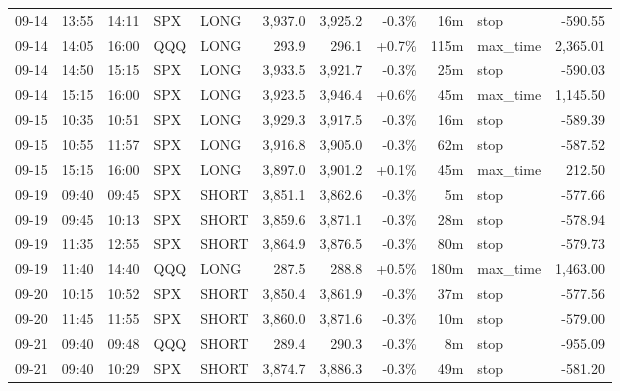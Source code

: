 \documentclass[11pt,a4paper,twoside]{article}
\begin{document}
\begin{center}
\begin{longtable}{>{\color{txtmain}}l l l l l r r r r >{\color{txtmain}}l r}
09-14 & 13:55 & 14:11 & SPX & LONG & 3,937.0 & 3,925.2 & \textcolor{lossred}{-0.3\%} & 16m & stop & \textcolor{lossred}{-590.55} \\
09-14 & 14:05 & 16:00 & QQQ & LONG & 293.9 & 296.1 & \textcolor{wingreen}{+0.7\%} & 115m & max\_time & \textcolor{wingreen}{2,365.01} \\
09-14 & 14:50 & 15:15 & SPX & LONG & 3,933.5 & 3,921.7 & \textcolor{lossred}{-0.3\%} & 25m & stop & \textcolor{lossred}{-590.03} \\
09-14 & 15:15 & 16:00 & SPX & LONG & 3,923.5 & 3,946.4 & \textcolor{wingreen}{+0.6\%} & 45m & max\_time & \textcolor{wingreen}{1,145.50} \\
09-15 & 10:35 & 10:51 & SPX & LONG & 3,929.3 & 3,917.5 & \textcolor{lossred}{-0.3\%} & 16m & stop & \textcolor{lossred}{-589.39} \\
09-15 & 10:55 & 11:57 & SPX & LONG & 3,916.8 & 3,905.0 & \textcolor{lossred}{-0.3\%} & 62m & stop & \textcolor{lossred}{-587.52} \\
09-15 & 15:15 & 16:00 & SPX & LONG & 3,897.0 & 3,901.2 & \textcolor{wingreen}{+0.1\%} & 45m & max\_time & \textcolor{wingreen}{212.50} \\
09-19 & 09:40 & 09:45 & SPX & SHORT & 3,851.1 & 3,862.6 & \textcolor{lossred}{-0.3\%} & 5m & stop & \textcolor{lossred}{-577.66} \\
09-19 & 09:45 & 10:13 & SPX & SHORT & 3,859.6 & 3,871.1 & \textcolor{lossred}{-0.3\%} & 28m & stop & \textcolor{lossred}{-578.94} \\
09-19 & 11:35 & 12:55 & SPX & SHORT & 3,864.9 & 3,876.5 & \textcolor{lossred}{-0.3\%} & 80m & stop & \textcolor{lossred}{-579.73} \\
09-19 & 11:40 & 14:40 & QQQ & LONG & 287.5 & 288.8 & \textcolor{wingreen}{+0.5\%} & 180m & max\_time & \textcolor{wingreen}{1,463.00} \\
09-20 & 10:15 & 10:52 & SPX & SHORT & 3,850.4 & 3,861.9 & \textcolor{lossred}{-0.3\%} & 37m & stop & \textcolor{lossred}{-577.56} \\
09-20 & 11:45 & 11:55 & SPX & SHORT & 3,860.0 & 3,871.6 & \textcolor{lossred}{-0.3\%} & 10m & stop & \textcolor{lossred}{-579.00} \\
09-21 & 09:40 & 09:48 & QQQ & SHORT & 289.4 & 290.3 & \textcolor{lossred}{-0.3\%} & 8m & stop & \textcolor{lossred}{-955.09} \\
09-21 & 09:40 & 10:29 & SPX & SHORT & 3,874.7 & 3,886.3 & \textcolor{lossred}{-0.3\%} & 49m & stop & \textcolor{lossred}{-581.20} \\

\end{longtable}
\end{center}
\end{document}
